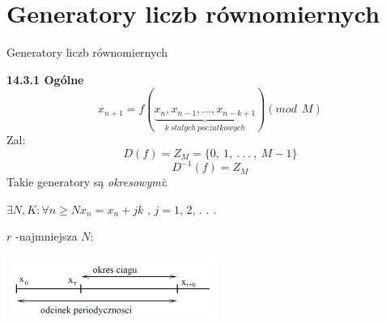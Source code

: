 \section{Generatory liczb równomiernych}
	\begin{frame}{Generatory liczb równomiernych}


	\textbf{14.3.1 Ogólne}
	\[
	x_{n+1}=f(\underbrace{x_{n},x_{n-1},\ldots,x_{n-k+1}}_{k \:stalych\: poczatkowych}) (mod\ \ M)
	\]
	Zal:
	$$
	D(f)=Z_{M}=\{0,\ 1,\ .\ .\ .\ ,\ M-1\}
	$$
	$$
	D^{-1}(f)=Z_{M}
	$$
	Takie generatory są {\it okresowymi}:
	\begin{center}
	$\exists N, K:\forall n\geq N x_{n}=x_{n}+jk$ , $j=1$, 2, . . .
	\end{center}
	$r$ -najmniejsza $N$:
    \begin{center}
	\includegraphics[width=70mm,height=20mm]{img/14/14_3_1_img}
	\end{center}
	\end{frame}

